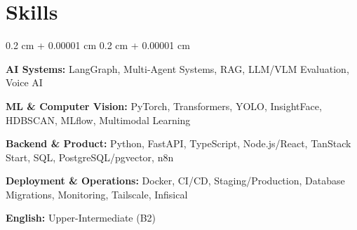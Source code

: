 \documentclass[10pt, letterpaper]{article}
\newenvironment{onecolentry}{
    \begin{adjustwidth}{
        0.2 cm + 0.00001 cm
    }{
        0.2 cm + 0.00001 cm
    }
}{
    \end{adjustwidth}
} %
\begin{document}


\section{Skills}
\begin{onecolentry}
\textbf{AI Systems:} LangGraph, Multi-Agent Systems, RAG, LLM/VLM Evaluation, Voice AI

\vspace{0.1 cm}

\textbf{ML \& Computer Vision:} PyTorch, Transformers, YOLO, InsightFace, HDBSCAN, MLflow, Multimodal Learning

\vspace{0.1 cm}

\textbf{Backend \& Product:} Python, FastAPI, TypeScript, Node.js/React, TanStack Start, SQL, PostgreSQL/pgvector, n8n

\vspace{0.1 cm}

\textbf{Deployment \& Operations:} Docker, CI/CD, Staging/Production, Database Migrations, Monitoring, Tailscale, Infisical

\vspace{0.1 cm}

\textbf{English:} Upper-Intermediate (B2)
\end{onecolentry}
\end{document}
